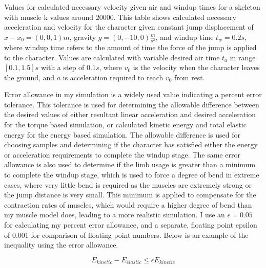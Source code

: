 \begin{table}[ht]
	\centering
	\caption[Calculated required velocities for a jump given skeleton and desired air and windup times]{Values for calculated necessary velocity given air and windup times for a skeleton with muscle k values around 20000. This table shows calculated necessary acceleration and velocity for the character given constant jump displacement of $x - x_0 = (0, 0, 1)m$, gravity $g=(0, -10, 0)\frac{m}{s^2}$, and windup time $t_w = 0.2s$, where windup time refers to the amount of time the force of the jump is applied to the character. Values are calculated with variable desired air time $t_a$ in range $[0.1, 1.5]s$ with a step of $0.1s$, where $v_0$ is the velocity when the character leaves the ground, and $a$ is acceleration required to reach $v_0$ from rest.}
	\label{tab:path_est}
	
\end{table}

Error allowance in my simulation is a widely used value indicating a percent error tolerance.  This tolerance is used for determining the allowable difference between the desired values of either resultant linear acceleration and desired acceleration for the torque based simulation, or calculated kinetic energy and total elastic energy for the energy based simulation.  The allowable difference is used for choosing samples and determining if the character has satisfied either the energy or acceleration requirements to complete the windup stage.  The same error allowance is also used to determine if the limb usage is greater than a minimum to complete the windup stage, which is used to force a degree of bend in extreme cases, where very little bend is required as the muscles are extremely strong or the jump distance is very small.  This minimum is applied to compensate for the contraction rates of muscles, which would require a higher degree of bend than my muscle model does, leading to a more realistic simulation.  I use an $\epsilon=0.05$ for calculating my percent error allowance, and a separate, floating point epsilon of 0.001 for comparison of floating point numbers.  Below is an example of the inequality using the error allowance.  

\[
	E_{kinetic} - E_{elastic} \le \epsilon E_{kinetic}
\]

